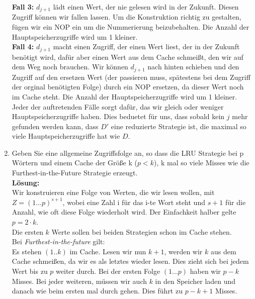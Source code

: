 \documentclass[11pt,a4paper,ngerman]{article}
\begin{document}
\begin{enumerate}[\bfseries (a)]
\textbf{Fall 3:} $d_{j+1}$ lädt einen Wert, der nie gelesen wird in der Zukunft. Diesen Zugriff können wir fallen lassen. Um die Konstruktion richtig zu gestalten, fügen wir ein NOP ein um die Nummerierung beizubehalten. Die Anzahl der Hauptspeicherzugriffe wird um 1 kleiner.\\

\textbf{Fall 4:} $d_{j+1}$ macht einen Zugriff, der einen Wert liest, der in der Zukunft benötigt wird, dafür aber einen Wert aus dem Cache schmeißt, den wir auf dem Weg noch brauchen. Wir können $d_{j+1}$ nach hinten schieben und den Zugriff auf den ersetzen Wert (der passieren muss, spätestens bei dem Zugriff der orginal benötigten Folge) durch ein NOP ersetzen, da dieser Wert noch im Cache steht. Die Anzahl der Hauptspeicherzugriffe wird um 1 kleiner.\\

Jeder der auftretenden Fälle sorgt dafür, das wir gleich oder weniger Hauptspeicherzugriffe haben. Dies beduetet für uns, dass sobald kein $j$ mehr gefunden werden kann, dass $D'$ eine reduzierte Strategie ist, die maximal so viele Hauptspeicherzugriffe hat wie $D$.

\item Geben Sie eine allgemeine Zugriffsfolge an, so dass die LRU Strategie bei p Wörtern und einem Cache der Größe k ($p<k$),  k mal so viele Misses wie die Furthest-in-the-Future Strategie erzeugt.\\

\textbf{Lösung:}\\

Wir konstruieren eine Folge von Werten, die wir lesen wollen, mit $Z = (1 ... p)^{s+1}$, wobei eine Zahl i für das i-te Wort steht und $s+1$ für die Anzahl, wie oft diese Folge wiederholt wird. Der Einfachkeit halber gelte $p = 2 \cdot k$.\\

Die ersten $k$ Werte sollen bei beiden Strategien schon im Cache stehen.\\

Bei \emph{Furthest-in-the-future} gilt:\\
Es stehen $(1..k)$ im Cache. Lesen wir nun $k+1$, werden wir $k$ aus dem Cache schmeißen, da wir es als letztes wieder lesen. Dies zieht sich bei jedem Wert bis zu $p$ weiter durch. Bei der ersten Folge $(1...p)$ haben wir $p - k$ Misses. Bei jeder weiteren, müssen wir auch $k$ in den Speicher laden und danach wie beim ersten mal durch gehen. Dies führt zu $p-k+1$ Misses.\\


\end{enumerate}
\end{document}
